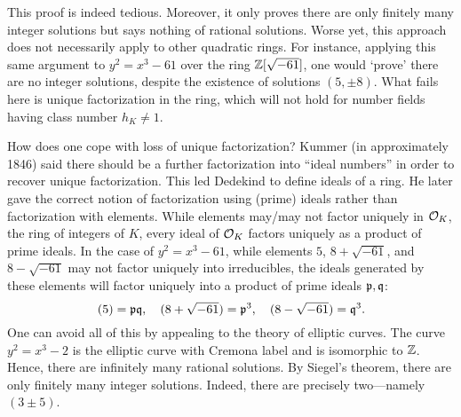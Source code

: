 \begin{ex}
This proof is indeed tedious. Moreover, it only proves there are only finitely many integer solutions but says nothing of rational solutions. Worse yet, this approach does not necessarily apply to other quadratic rings. For instance, applying this same argument to $y^2= x^3 - 61$ over the ring $\mathbb{Z}[\sqrt{-61}]$, one would `prove' there are no integer solutions, despite the existence of solutions $(5,\pm 8)$. What fails here is unique factorization in the ring, which will not hold for number fields having class number $h_K \neq 1$. 

How does one cope with loss of unique factorization? Kummer (in approximately 1846) said there should be a further factorization into ``ideal numbers'' in order to recover unique factorization. This led Dedekind to define ideals of a ring. He later gave the correct notion of factorization using (prime) ideals rather than factorization with elements. While elements may/may not factor uniquely in $\mathcal{O}_K$, the ring of integers of $K$, every ideal of $\mathcal{O}_K$ factors uniquely as a product of prime ideals. In the case of $y^2= x^3 - 61$, while elements $5$, $8 + \sqrt{-61}$, and $8 - \sqrt{-61}$ may not factor uniquely into irreducibles, the ideals generated by these elements will factor uniquely into a product of prime ideals $\mathfrak{p}, \mathfrak{q}$:
	\[
	(5)= \mathfrak{p} \mathfrak{q}, \quad (8 + \sqrt{-61})= \mathfrak{p}^3, \quad (8 - \sqrt{-61})= \mathfrak{q}^3. 
	\]
One can avoid all of this by appealing to the theory of elliptic curves. The curve $y^2= x^3 - 2$ is the elliptic curve with Cremona label \ostevo{} and is isomorphic to $\mathbb{Z}$. Hence, there are infinitely many rational solutions. By Siegel's theorem, there are only finitely many integer solutions. Indeed, there are precisely two---namely $(3 \pm 5)$. 
\end{ex}


